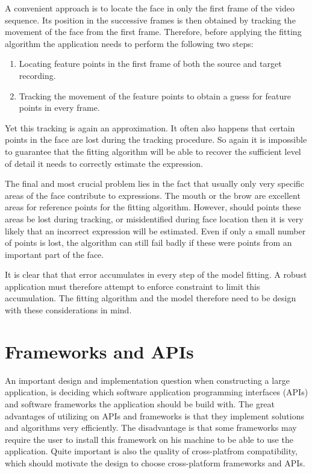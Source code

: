 \documentclass[11pt,a4paper]{report}
\begin{document}
A convenient approach is to locate the face in only the first frame of the video
sequence. Its position in the successive frames is then obtained by tracking the
movement of the face from the first frame. Therefore, before applying the
fitting algorithm the application needs to perform the following two steps:
\begin{enumerate}
\item Locating feature points in the first frame of both the source and target
  recording.
\item Tracking the movement of the feature points to obtain a guess for feature
  points in every frame.
\end{enumerate}

Yet this tracking is again an approximation. It often also happens that certain points in the face are lost
during the tracking procedure. So again it is impossible to guarantee that the
fitting algorithm will be able to recover the sufficient level of detail it
needs to correctly estimate the expression.


The final and most crucial problem lies in the fact that usually only very specific
areas of the face contribute to expressions. The mouth or the brow are excellent
areas for reference points for the fitting algorithm. However, should points these
areas be lost during tracking, or misidentified during face location then it is
very likely that an incorrect expression will be estimated. Even if only a small
number of points is lost, the algorithm can still fail badly if these were
points from an important part of the face.

It is clear that that error accumulates in every step of the model
fitting. A robust application must therefore attempt to enforce constraint to limit this
accumulation. The fitting algorithm and the model therefore need to be design
with these considerations in mind.

\section{Frameworks and APIs}
An important design and implementation question when constructing a large
application, is deciding which software application programming interfaces
(APIs) and software frameworks the application should be build with. The
great advantages of utilizing on APIs and frameworks is that they implement solutions
and algorithms very efficiently. The disadvantage is that some frameworks may
require the user to install this framework on his machine to be able to use the
application. Quite important is also the quality of cross-platfrom
compatibility, which should motivate the design to choose cross-platform
frameworks and APIs.
\end{document}
